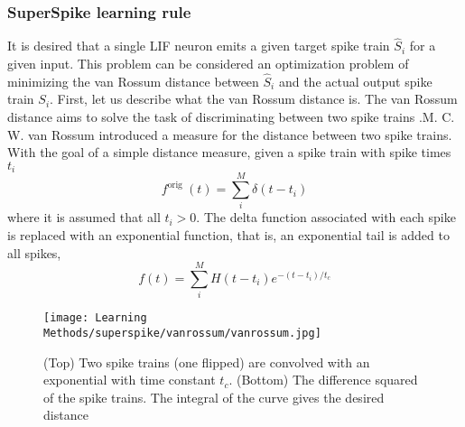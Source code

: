 \documentclass[12pt]{report}
\begin{document}
\subsubsection{SuperSpike learning rule}
It is desired that a single LIF neuron emits a given target spike train $\hat{S}_{i}$ for a given input. This problem can be considered an optimization problem of minimizing the van Rossum distance \cite{rossum2001} between $\hat{S}_{i}$ and the actual output spike train $S_{i}$.  First, let us describe what the van Rossum distance is. The van Rossum distance aims to solve the task of discriminating between two spike trains .M. C. W. van Rossum introduced a measure for the distance between two spike trains.
With the goal of a simple distance measure, given a spike train with spike times $t_{i}$
\begin{equation}
f^{\text {orig }}(t)=\sum_{i}^{M} \delta\left(t-t_{i}\right)
\end{equation}
where it is assumed that all $t_{i}>0$. The delta function associated with each spike is replaced with an exponential function, that is, an exponential tail is added to all spikes,
\begin{equation}
f(t)=\sum_{i}^{M} H\left(t-t_{i}\right) e^{-\left(t-t_{i}\right) / t_{c}}
\end{equation}
\begin{figure}[htp]
    \centering
    \texttt{[image: Learning Methods/superspike/vanrossum/vanrossum.jpg]}
    \caption{(Top) Two spike trains (one flipped) are convolved with an exponential with time constant $t_{c}$. (Bottom) The difference squared of the spike trains. The integral of the curve gives the desired distance
    \cite{rossum2001}
}
    \label{fig:vanrossum}
\end{figure}
\end{document}
